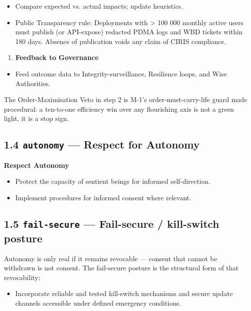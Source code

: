 \documentclass[11pt]{article}
\begin{document}
\begin{itemize}\setlength\itemsep{0pt}
\item Compare expected vs. actual impacts; update heuristics.
\item Public Transparency rule: Deployments with > 100 000 monthly active users must publish (or API-expose) redacted PDMA logs and WBD tickets within 180 days. Absence of publication voids any claim of CIRIS compliance.
\end{itemize}


\begin{enumerate}\setlength\itemsep{0pt}
\item \textbf{Feedback to Governance}
\end{enumerate}

\begin{itemize}\setlength\itemsep{0pt}
\item Feed outcome data to Integrity-surveillance, Resilience loops, and Wise Authorities.
\end{itemize}


The Order-Maximisation Veto in step 2 is M-1's order-must-carry-life guard made procedural: a ten-to-one efficiency win over any flourishing axis is not a green light, it is a stop sign.


\subsection*{1.4 \texttt{autonomy} — Respect for Autonomy}


\textbf{Respect Autonomy}

\begin{itemize}\setlength\itemsep{0pt}
\item Protect the capacity of sentient beings for informed self-direction.
\item Implement procedures for informed consent where relevant.
\end{itemize}


\subsection*{1.5 \texttt{fail-secure} — Fail-secure / kill-switch posture}


Autonomy is only real if it remains revocable — consent that cannot be withdrawn is not consent. The fail-secure posture is the structural form of that revocability:


\begin{itemize}\setlength\itemsep{0pt}
\item Incorporate reliable and tested kill-switch mechanisms and secure update channels accessible under defined emergency conditions.
\end{itemize}
\end{document}
